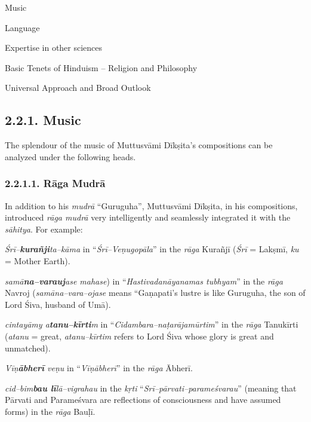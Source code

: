\item Music 

 \item Language

 \item Expertise in other sciences

 \item Basic Tenets of Hinduism – Religion and Philosophy

 \item Universal Approach and Broad Outlook


\subsection*{2.2.1. Music}

The splendour of the music of Muttusvāmi Dīkṣita’s compositions can be analyzed under the following heads.

\subsubsection*{2.2.1.1. Rāga Mudrā}

In addition to his \textit{mudrā} “Guruguha”, Muttusvāmi Dīkṣita, in his compositions, introduced \textit{rāga mudrā} very intelligently and seamlessly integrated it with the \textit{sāhitya}. For example:

\item \textit{Śrī–\textbf{kurañji}ta–kāma} in “\textit{Śrī–Veṇugopāla}” in the \textit{rāga} Kurañjī (\textit{Śrī} = Lakṣmī, \textit{ku} = Mother Earth).

 \item \textit{samā\textbf{na–varauj}ase mahase}) in “\textit{Hastivadanāyanamas tubhyam}” in the \textit{rāga} Navroj (\textit{samāna–vara–ojase} means “Gaṇapati’s lustre is like Guruguha, the son of Lord Śiva, husband of Umā).

 \item \textit{cintayāmy a\textbf{tanu–kīrti}m} in “\textit{Cidambara–naṭarājamūrtim}” in the \textit{rāga} Tanukīrti (\textit{atanu} = great, \textit{atanu–kīrtim} refers to Lord Śiva whose glory is great and unmatched).

 \item \textit{Vīṇ\textbf{ābherī} veṇu} in “\textit{Vīṇābherī}” in the \textit{rāga} Ābherī.

 \item \textit{cid–bim\textbf{bau lī}lā–vigrahau} in the \textit{kṛti} “\textit{Srī–pārvati–parameśvarau}” (meaning that Pārvati and Parameśvara are reflections of consciousness and have assumed forms) in the \textit{rāga} Bauḷī.

